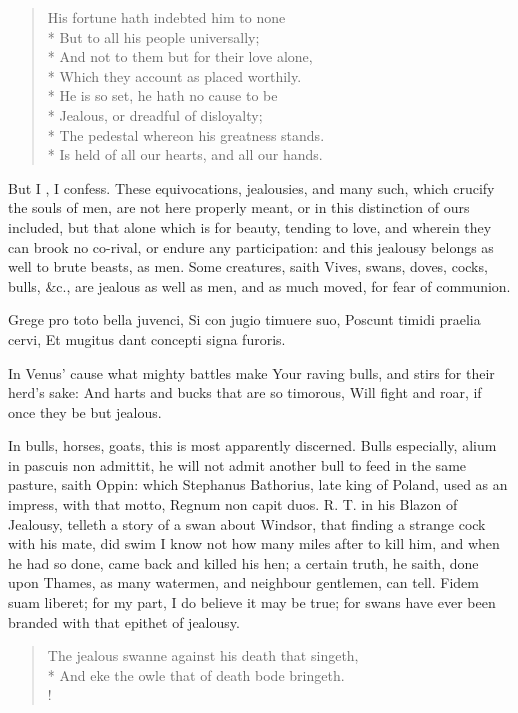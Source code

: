 {\begin{verse}
His fortune hath indebted him to none\\*
But to all his people universally;\\*
And not to them but for their love alone,\\*
Which they account as placed worthily.\\*
He is so set, he hath no cause to be\\*
Jealous, or dreadful of disloyalty;\\*
The pedestal whereon his greatness stands.\\*
Is held of all our hearts, and all our hands.
\end{verse}

But I , I confess. These equivocations, jealousies, and many such,
which crucify the souls of men, are not here properly meant, or in this
distinction of ours included, but that alone which is for beauty,
tending to love, and wherein they can brook no co-rival, or endure any
participation: and this jealousy belongs as well to brute beasts, as
men. Some creatures, saith Vives, swans, doves, cocks, bulls,
\&c., are jealous as well as men, and as much moved, for fear of
communion.

Grege pro toto bella juvenci,
Si con jugio timuere suo,
Poscunt timidi praelia cervi,
Et mugitus dant concepti signa furoris.

In Venus' cause what mighty battles make
Your raving bulls, and stirs for their herd's sake:
And harts and bucks that are so timorous,
Will fight and roar, if once they be but jealous.

In bulls, horses, goats, this is most apparently discerned. Bulls
especially, alium in pascuis non admittit, he will not admit another
bull to feed in the same pasture, saith Oppin: which Stephanus
Bathorius, late king of Poland, used as an impress, with that motto,
Regnum non capit duos. R. T. in his Blazon of Jealousy, telleth a story
of a swan about Windsor, that finding a strange cock with his mate, did
swim I know not how many miles after to kill him, and when he had so
done, came back and killed his hen; a certain truth, he saith, done
upon Thames, as many watermen, and neighbour gentlemen, can tell. Fidem
suam liberet; for my part, I do believe it may be true; for swans have
ever been branded with that epithet of jealousy.

{
\verselinenumbersleft
{}
{\gothfont
\begin{verse}
The jealous swanne against his death that singeth,\\*
And eke the owle that of death bode bringeth.\\!
\end{verse}
}
\verselinenumbersright
}

}
